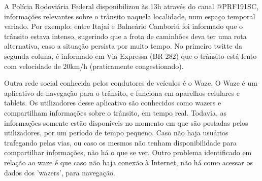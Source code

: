 \begin{figure}[ht]
	\quad \quad \quad \quad
\end{figure}

A Polícia Rodoviária Federal disponibilizou às 13h através do canal @PRF191SC, informações relevantes sobre o trânsito naquela localidade, 
num espaço temporal variado. Por exemplo: entre Itajaí e Balneário Camboriú foi informado que o trânsito estava intenso, sugerindo que a frota de caminhões deva ter uma rota alternativa, caso a situação persista por muito tempo. No primeiro twitte da segunda coluna, é informado em Via Expressa (BR 282) que o trânsito está lento com velocidade de 20km/h (praticamente congestionado). 


Outra rede social conhecida pelos condutores de veículos é o Waze. O Waze é um aplicativo de navegação para o trânsito, e funciona em aparelhos celulares e tablets. Os utilizadores desse aplicativo são conhecidos como wazers e compartilham informações sobre o trânsito, em tempo real. Todavia, as informações somente estão disponíveis no momento em que são postadas pelos utilizadores, por um período de tempo pequeno. Caso não haja usuários trafegando pelas vias, ou caso os mesmos não tenham disponibilidade para compartilhar informações, não há o que se ver. Outro problema identificado em relação ao waze é que caso não haja conexão à Internet, não há como acessar os dados dos 'wazers', para navegação.

